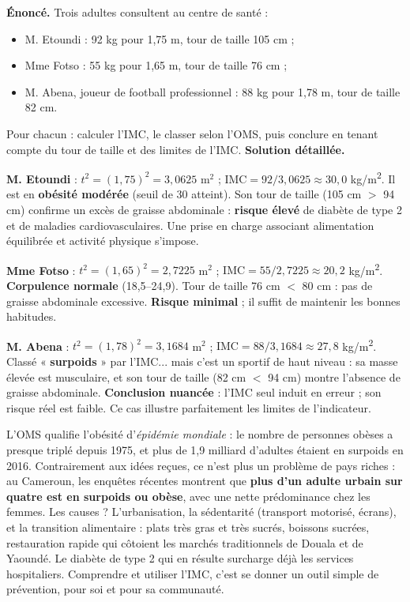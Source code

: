 \documentclass[11pt]{article}
\begin{document}
\begin{exoresolu}
\textbf{Énoncé.} Trois adultes consultent au centre de santé :
\begin{itemize}
\item M. Etoundi : 92 kg pour 1,75 m, tour de taille 105 cm ;
\item Mme Fotso : 55 kg pour 1,65 m, tour de taille 76 cm ;
\item M. Abena, joueur de football professionnel : 88 kg pour 1,78 m, tour de taille 82 cm.
\end{itemize}
Pour chacun : calculer l'IMC, le classer selon l'OMS, puis conclure en tenant compte du tour de taille et des limites de l'IMC.
\tcblower
\textbf{Solution détaillée.}

\textbf{M. Etoundi} : $t^2 = (1{,}75)^2 = 3{,}0625$ m$^2$ ; $\text{IMC} = 92 / 3{,}0625 \approx 30{,}0$ \si{kg/m^2}. Il est en \textbf{obésité modérée} (seuil de 30 atteint). Son tour de taille (105 cm $>$ 94 cm) confirme un excès de graisse abdominale : \textbf{risque élevé} de diabète de type 2 et de maladies cardiovasculaires. Une prise en charge associant alimentation équilibrée et activité physique s'impose.

\textbf{Mme Fotso} : $t^2 = (1{,}65)^2 = 2{,}7225$ m$^2$ ; $\text{IMC} = 55 / 2{,}7225 \approx 20{,}2$ \si{kg/m^2}. \textbf{Corpulence normale} (18,5--24,9). Tour de taille 76 cm $<$ 80 cm : pas de graisse abdominale excessive. \textbf{Risque minimal} ; il suffit de maintenir les bonnes habitudes.

\textbf{M. Abena} : $t^2 = (1{,}78)^2 = 3{,}1684$ m$^2$ ; $\text{IMC} = 88 / 3{,}1684 \approx 27{,}8$ \si{kg/m^2}. Classé « \textbf{surpoids} » par l'IMC... mais c'est un sportif de haut niveau : sa masse élevée est musculaire, et son tour de taille (82 cm $<$ 94 cm) montre l'absence de graisse abdominale. \textbf{Conclusion nuancée} : l'IMC seul induit en erreur ; son risque réel est faible. Ce cas illustre parfaitement les limites de l'indicateur.
\end{exoresolu}

\begin{savaistu}
L'OMS qualifie l'obésité d'\emph{épidémie mondiale} : le nombre de personnes obèses a presque triplé depuis 1975, et plus de 1,9 milliard d'adultes étaient en surpoids en 2016. Contrairement aux idées reçues, ce n'est plus un problème de pays riches : au Cameroun, les enquêtes récentes montrent que \textbf{plus d'un adulte urbain sur quatre est en surpoids ou obèse}, avec une nette prédominance chez les femmes. Les causes ? L'urbanisation, la sédentarité (transport motorisé, écrans), et la transition alimentaire : plats très gras et très sucrés, boissons sucrées, restauration rapide qui côtoient les marchés traditionnels de Douala et de Yaoundé. Le diabète de type 2 qui en résulte surcharge déjà les services hospitaliers. Comprendre et utiliser l'IMC, c'est se donner un outil simple de prévention, pour soi et pour sa communauté.
\end{savaistu}
\end{document}
